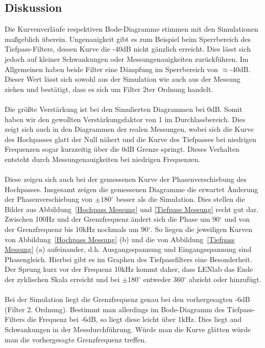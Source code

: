 \subsection{Diskussion}
Die Kurvenverläufe respektiven Bode-Diagramme stimmen mit den Simulationen maßgeblich überein. Ungenauigkeit gibt es zum Beispiel beim Sperrbereich des Tiefpass-Filters, dessen Kurve die -40\si{\dB} nicht gänzlich erreicht. Dies lässt sich jedoch auf kleiner Schwankungen oder Messungenauigkeiten zurückführen. Im Allgemeinen haben beide Filter eine Dämpfung im Sperrbereich von $\approx$-40\si{\dB}. Dieser Wert lässt sich sowohl aus der Simulation wie auch aus der Messung ziehen und bestätigt, dass es sich um Filter 2ter Ordnung handelt.\\
\\
Die größte Verstärkung ist bei den Simulierten Diagrammen bei 0\si{\dB}. Somit haben wir den gewollten Verstärkungsfaktor von 1 im Durchlassbereich. Dies zeigt sich auch in den Diagrammen der realen Messungen, wobei sich die Kurve des Hochpasses glatt der Null nähert und die Kurve des Tiefpasses bei niedrigen Frequenzen sogar kurzzeitig über die 0dB Grenze springt. Dieses Verhalten entsteht durch Messungenauigkeiten bei niedrigen Frequenzen.\\
\\
Diese zeigen sich auch bei der gemessenen Kurve der Phasenverschiebung des Hochpasses. Insgesamt zeigen die gemessenen Diagramme die erwartet Änderung der Phasenverschiebung von $\pm 180^\circ$ besser als die Simulation. Dies stellen die Bilder aus Abbildung~\ref{Hochpass Messung} und \ref{Tiefpass Messung} recht gut dar. Zwischen 100\si{\hertz} und der Grenzfrequenz ändert sich die Phase um 90$^\circ$ und von der Grenzfrequenz bis 10\si{\kilo\hertz} nochmals um 90$^\circ$. So liegen die jeweiligen Kurven von Abbildung~\ref{Hochpass Messung} (b) und die von Abbildung~\ref{Tiefpass Messung} (a) aufeinander, d.h. Ausgangsspannung und Eingangsspannung sind Phasengleich. Hierbei gibt es im Graphen des Tiefpassfilters eine Besonderheit. Der Sprung kurz vor der Frequenz 10\si{\kilo\hertz} kommt daher, dass LENlab das Ende der zyklischen Skala erreicht und bei $\pm 180^\circ$ entweder 360$^\circ$ abzieht oder hinzufügt.\\
\\
Bei der Simulation liegt die Grenzfrequenz genau bei den vorhergesagten -6dB (Filter 2. Ordnung). Bestimmt man allerdings im Bode-Diagramm des Tiefpass-Filters die Frequenz bei -6dB, so liegt diese leicht über 1\si{\kilo\hertz}. Dies liegt and Schwankungen in der Messdurchführung. Würde man die Kurve glätten würde man die vorhergesagte Grenzfrequenz treffen.\\
